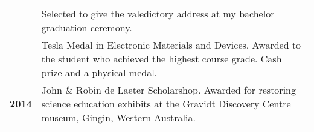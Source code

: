 \documentclass[a4paper,11pt]{article}
\begin{document}
\begin{tabular}{lp{}}
    & Selected to give the valedictory address at my bachelor graduation ceremony. \\

    & Tesla Medal in Electronic Materials and Devices. \textcolor{subduedcolour}{Awarded to the student who achieved the highest course grade. %
    Cash prize and a physical medal.} \\

    \textbf{2014} & John \& Robin de Laeter Scholarshop. \textcolor{subduedcolour}{Awarded for restoring science education exhibits at the Gravidt Discovery Centre museum, Gingin, Western Australia.}
\end{tabular}
\end{document}
